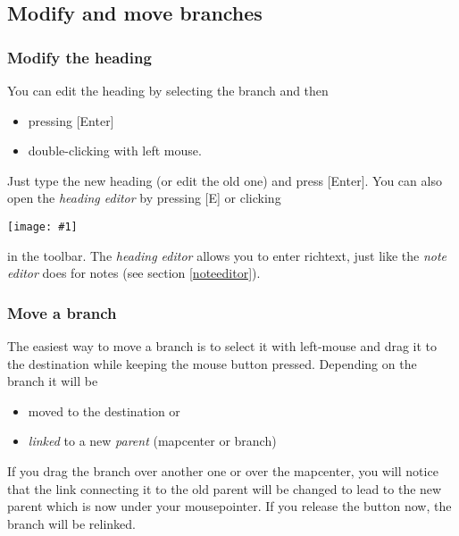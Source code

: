 \documentclass[12pt,a4paper]{article}
\newlength{\maximgwidth}
\newcommand{\maximage}[1]{  
    \begin{center}
        \texttt{[image: \#1]} 
    \end{center}
}
\newcommand{\key}[1]{[#1]}
\begin{document}
\subsection{Modify and move branches}
\subsubsection*{Modify the heading}  \label{editheading}
You can edit the heading by selecting the branch and then
\begin{itemize}
    \item pressing \key{Enter}
    \item double-clicking with left mouse.
\end{itemize}
Just type the new heading (or edit the old one) and press \key{Enter}.
You can also open the {\em heading editor} by pressing \key{E} or
clicking 
\maximage{images/headingeditor.png}
in the toolbar. The {\em heading editor} allows you to enter richtext, just
like the {\em note editor} does for notes (see section \ref{noteeditor}).

\subsubsection*{Move a branch}
The easiest way to move a branch is to select it with left-mouse and
drag it to the destination while keeping the mouse button pressed.
Depending on the branch  it will be
\begin{itemize}
    \item moved to the destination or
    \item {\em linked} to a new {\em parent} (mapcenter or branch)
\end{itemize}
If you drag the branch over another one or over the mapcenter, you will
notice that the  link connecting it to the old parent will be changed to
lead to the  new parent which is now under your mousepointer.  If you
release the button now, the branch will be relinked.
\end{document}
